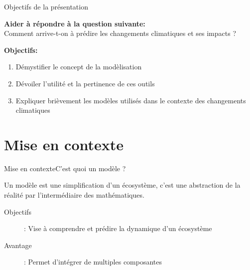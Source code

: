 \documentclass{eecslides}
\begin{document}
	\begin{frame}{Objectifs de la présentation}
	    
	\textbf{\alert{Aider à répondre à la question suivante:}} \\
	Comment arrive-t-on à prédire les changements climatiques et ses impacts ?\\

	\vfill

	\textbf{\alert{Objectifs}: }
		    \begin{enumerate}
			\item Démystifier le concept de la modèlisation
			\item Dévoiler l'utilité et la pertinence de ces outils 
			\item Expliquer brièvement les modèles utilisés dans le contexte des changements climatiques
		    \end{enumerate}

	\end{frame}


	\section{Mise en contexte}






	\begin{frame}{Mise en contexte}{C'est quoi un modèle ?} 
		
		Un modèle est une \alert{simplification} d'un écosystème, c'est une abstraction de la réalité par l'intermédiaire des mathématiques.\\
		\vspace{0.2cm}
		\begin{description}
			\item [Objectifs]:  Vise à comprendre et prédire la dynamique d'un écosystème
			\item [Avantage]: Permet d'intégrer de multiples composantes 
		\end{description}
	\end{frame}
\end{document}
